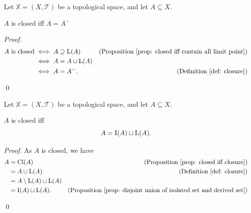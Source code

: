 \begin{proposition}
	\label{prop: closed iff closure}
	Let $\mathbb X = (X, \mathcal T)$ be a topological space, and let $A \subseteq X$.
	
	$A$ is closed iff $A = A^-$
	
	\begin{proof}
		$$
		\begin{aligned}
			A \text{ is closed} &\iff A \supseteq \mathrm{L}(A)
				&\text{(Proposition \ref{prop: closed iff contain all limit point})}\\
			&\iff A = A \cup \mathrm{L}(A)
				\\
			&\iff A = A^-.
				&\text{(Definition \ref{def: closure})} \\
		\end{aligned}
		$$
	
		\qed
	\end{proof}
\end{proposition}


\begin{proposition}
	\label{prop: closure is disjoint union of derived and isolated set}
	Let $\mathbb X = (X, \mathcal T)$ be a topological space, and let $A \subseteq X$.
	
	$A$ is closed iff
	$$
	A = \mathrm{I}(A) \sqcup \mathrm{L}(A).
	$$
	
	\begin{proof}
		As $A$ is closed, we have
		$$
		\begin{aligned}
			A &= \mathrm{Cl} (A) 
				&\text{(Proposition \ref{prop: closed iff closure})} \\
			&= A \cup \mathrm{L}(A)
				&\text{(Definition \ref{def: closure})} \\
			&= A \setminus \mathrm{L}(A) \sqcup \mathrm{L}(A)
				\\
			& = \mathrm{I} (A) \sqcup \mathrm{L}(A).
				&\text{(Proposition \ref{prop: disjoint union of isolated set and derived set})}
		\end{aligned}
		$$
		
		\qed
	\end{proof}
\end{proposition}



